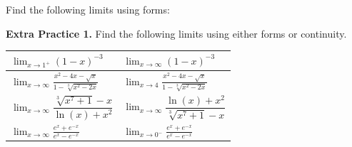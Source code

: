 \documentclass[10pt]{article}
\begin{document}
\newpage

 Find the following limits using forms:

\newpage%

{\bf\color{blue}Extra Practice 1.}\reversemarginpar{} Find the following limits using either forms or continuity.\\

\begin{tabular}{ p{3.25in} | p{3.25in} }
%
$\displaystyle\lim_{x\to1^+} (1-x)^{-3} $ & $\displaystyle\lim_{x\to\infty} (1-x)^{-3}$\\[2in]
%
\hline
%
$\displaystyle\lim_{x\to\infty} \frac{x^2-4x-\sqrt{x}}{1-\sqrt[3]{x^2-2x}}$ & $\displaystyle\lim_{x\to4} \frac{x^2-4x-\sqrt{x}}{1-\sqrt[3]{x^2-2x}}$\\[2in]
%
\hline
%
$\displaystyle\lim_{x\to\infty} \dfrac{\sqrt[3]{x^7+1}-x}{\ln(x)+x^2} $ & $\displaystyle\lim_{x\to\infty} \dfrac{\ln(x)+x^2}{\sqrt[3]{x^7+1}-x}$\\[2in]
%
\hline
%
$\displaystyle\lim_{x\to\infty} \frac{e^x+e^{-x}}{e^x-e^{-x}} $ & $\displaystyle\lim_{x\to0^-} \frac{e^x+e^{-x}}{e^x-e^{-x}} $\\[2in]
%
\end{tabular}
\end{document}
